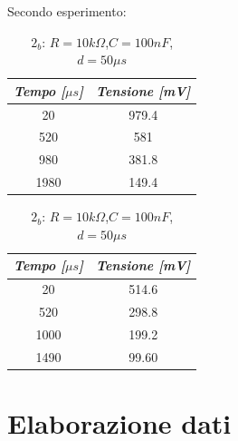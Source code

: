     Secondo esperimento:
    \begin{table} [!htb]
        \begin{minipage}[c]{0.5\textwidth}
            \caption{$2_a$: $R = 10k\Omega$,$C = 100nF$, $d=100\mu s$}
            \centering
            \begin{tabular}{|c|c|}
                \hline
                \textit{Tempo [$\mu s$]} & \textit{Tensione [mV]} \\
                \hline
                20 & 979.4 \\
                \hline
                520 & 581 \\
                \hline
                980 & 381.8 \\
                \hline
                1980 & 149.4 \\
                \hline
            \end{tabular}
        \end{minipage}
        \begin{minipage}[c]{0.5\textwidth}
            \caption{$2_b$: $R = 10k\Omega$,$C = 100nF$, $d=50\mu s$}
            \centering
            \begin{tabular}{|c|c|}
                \hline
                \textit{Tempo [$\mu s$]} & \textit{Tensione [mV]} \\
                \hline
                20 & 514.6 \\
                \hline
                520 & 298.8 \\
                \hline
                1000 & 199.2 \\
                \hline
                1490 & 99.60 \\
                \hline
            \end{tabular}
        \end{minipage}
    \end{table}

    \section{Elaborazione dati}

